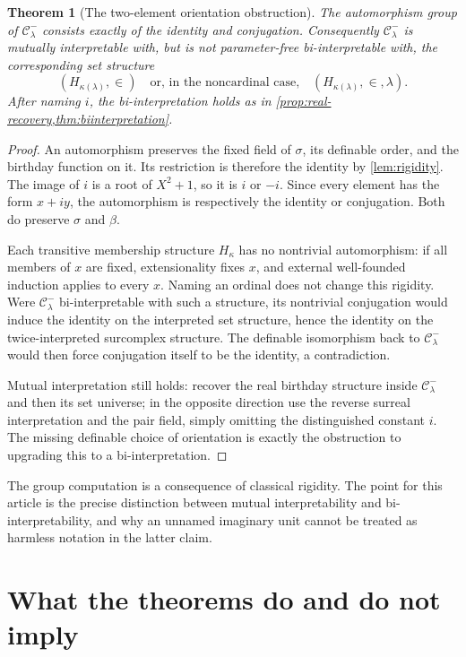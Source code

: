 \documentclass[11pt,letterpaper]{article}
\newtheorem{theorem}{Theorem}[section]
\theoremstyle{definition}
\theoremstyle{remark}
\newcommand{\C}{\mathcal C}
\begin{document}
\begin{theorem}[The two-element orientation obstruction]
\label{thm:orientation}
The automorphism group of $\C_\lambda^-$ consists exactly of the identity
and conjugation. Consequently $\C_\lambda^-$ is mutually interpretable
with, but is not parameter-free bi-interpretable with, the corresponding
set structure
\[
 (H_{\kappa(\lambda)},\in)
 \quad\text{or, in the noncardinal case,}\quad
 (H_{\kappa(\lambda)},\in,\lambda).
\]
After naming $i$, the bi-interpretation holds as in
\cref{prop:real-recovery,thm:biinterpretation}.
\end{theorem}
\begin{proof}
An automorphism preserves the fixed field of $\sigma$, its definable order,
and the birthday function on it. Its restriction is therefore the identity
by \cref{lem:rigidity}. The image of $i$ is a root of $X^2+1$, so it is
$i$ or $-i$. Since every element has the form $x+iy$, the automorphism is
respectively the identity or conjugation. Both do preserve $\sigma$ and
$\beta$.

Each transitive membership structure $H_\kappa$ has no nontrivial
automorphism: if all members of $x$ are fixed, extensionality fixes $x$,
and external well-founded induction applies to every $x$. Naming an ordinal
does not change this rigidity. Were $\C_\lambda^-$ bi-interpretable with
such a structure, its nontrivial conjugation would induce the identity on
the interpreted set structure, hence the identity on the twice-interpreted
surcomplex structure. The definable isomorphism back to
$\C_\lambda^-$ would then force conjugation itself to be the identity,
a contradiction.

Mutual interpretation still holds: recover the real birthday structure
inside $\C_\lambda^-$ and then its set universe; in the opposite direction
use the reverse surreal interpretation and the pair field, simply omitting
the distinguished constant $i$. The missing definable choice of orientation
is exactly the obstruction to upgrading this to a bi-interpretation.
\end{proof}

The group computation is a consequence of classical rigidity. The point for
this article is the precise distinction between mutual interpretability and
bi-interpretability, and why an unnamed imaginary unit cannot be treated as
harmless notation in the latter claim.

\section{What the theorems do and do not imply}
\label{sec:scope}
\end{document}

